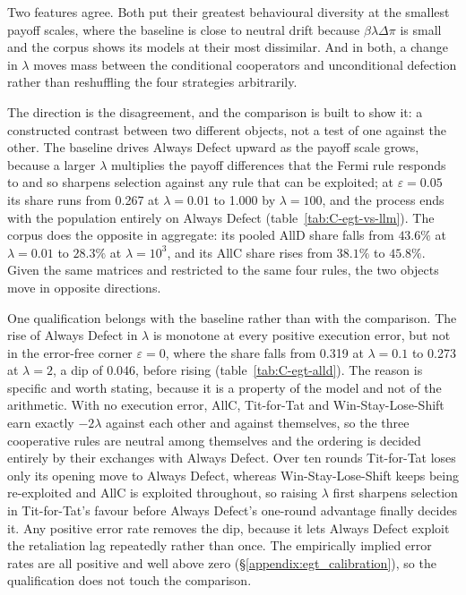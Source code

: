 \documentclass[11pt,a4paper]{article}
\newcommand{\lam}{\lambda}
\newcommand{\rev}[1]{{\color{red}#1}}
\newcommand{\rev}[1]{#1}
\begin{document}
Two features agree. Both put their greatest behavioural diversity at the smallest payoff scales, where the baseline is close to neutral drift because $\beta \lam \Delta\pi$ is small and the corpus shows its models at their most dissimilar. And in both, a change in $\lam$ moves mass between the conditional cooperators and unconditional defection rather than reshuffling the four strategies arbitrarily.

The direction is the disagreement, \rev{and the comparison is built to show it: a constructed contrast between two different objects, not a test of one against the other.} The baseline drives Always Defect upward as the payoff scale grows, because a larger $\lam$ multiplies the payoff differences that the Fermi rule responds to and so sharpens selection against any rule that can be exploited; at $\varepsilon = 0.05$ its share runs from 0.267 at $\lam = 0.01$ to 1.000 by $\lam = 100$, and the process ends with the population entirely on Always Defect (table~\ref{tab:C-egt-vs-llm}). The corpus does the opposite in aggregate: its pooled AllD share falls from $43.6\%$ at $\lam = 0.01$ to $28.3\%$ at $\lam = 10^{3}$, and its AllC share rises from $38.1\%$ to $45.8\%$. \rev{Given the same matrices and restricted to the same four rules, the two objects move in opposite directions.}

One qualification belongs with the baseline rather than with the comparison. The rise of Always Defect in $\lam$ is monotone at every positive execution error, but not in the error-free corner $\varepsilon = 0$, where the share falls from 0.319 at $\lam = 0.1$ to 0.273 at $\lam = 2$, a dip of 0.046, before rising (table~\ref{tab:C-egt-alld}). The reason is specific and worth stating, because it is a property of the model and not of the arithmetic. With no execution error, AllC, Tit-for-Tat and Win-Stay-Lose-Shift earn exactly $-2\lam$ against each other and against themselves, so the three cooperative rules are neutral among themselves and the ordering is decided entirely by their exchanges with Always Defect. Over ten rounds Tit-for-Tat loses only its opening move to Always Defect, whereas Win-Stay-Lose-Shift keeps being re-exploited and AllC is exploited throughout, so raising $\lam$ first sharpens selection in Tit-for-Tat's favour before Always Defect's one-round advantage finally decides it. Any positive error rate removes the dip, because it lets Always Defect exploit the retaliation lag repeatedly rather than once. The empirically implied error rates are all positive and well above zero (\S\ref{appendix:egt_calibration}), so the qualification does not touch the comparison.
\end{document}
